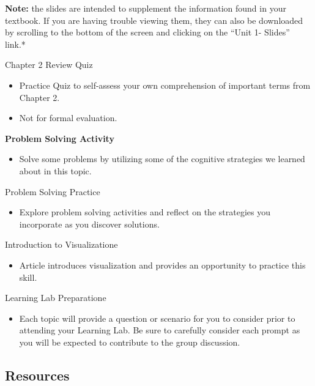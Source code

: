 \documentclass[
]{book}
\providecommand{\tightlist}{%
  \setlength{\itemsep}{0pt}\setlength{\parskip}{0pt}}
\begin{document}
\begin{reflect}
\textbf{Note:} the slides are intended to supplement the information found in your textbook. If you are having trouble viewing them, they can also be downloaded by scrolling to the bottom of the screen and clicking on the ``Unit 1- Slides'' link.*

{Chapter 2 Review Quiz}

\begin{itemize}
\tightlist
\item
  Practice Quiz to self-assess your own comprehension of important terms from Chapter 2.\\
\item
  Not for formal evaluation.
\end{itemize}

\textbf{Problem Solving Activity}

\begin{itemize}
\tightlist
\item
  Solve some problems by utilizing some of the cognitive strategies we learned about in this topic.
\end{itemize}

{Problem Solving Practice}

\begin{itemize}
\tightlist
\item
  Explore problem solving activities and reflect on the strategies you incorporate as you discover solutions.
\end{itemize}

{Introduction to Visualizatione}

\begin{itemize}
\tightlist
\item
  Article introduces visualization and provides an opportunity to practice this skill.
\end{itemize}

{Learning Lab Preparatione}

\begin{itemize}
\tightlist
\item
  Each topic will provide a question or scenario for you to consider prior to attending your Learning Lab. Be sure to carefully consider each prompt as you will be expected to contribute to the group discussion.
\end{itemize}
\end{reflect}

\hypertarget{resources}{%
\subsection*{Resources}\label{resources}}
\end{document}
